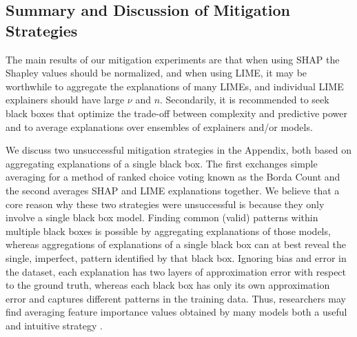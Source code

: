 \documentclass[12pt]{article}  %
\begin{document}
    \subsection{Summary and Discussion of Mitigation Strategies}
            \label{sec:summary_and_strategies}
             The main results of our mitigation experiments are that when using SHAP the Shapley values should be normalized, and when using LIME, it may be worthwhile to aggregate the explanations of many LIMEs, and individual LIME explainers should have large $\nu$ and $n$. Secondarily, it is recommended to seek black boxes that optimize the trade-off between complexity and predictive power and to average explanations over ensembles of explainers and/or models. 

            We discuss two unsuccessful mitigation strategies in the Appendix, both based on aggregating explanations of a single black box. The first exchanges simple averaging for a method of ranked choice voting known as the Borda Count and the second averages SHAP and LIME explanations together. We believe that a core reason why these two strategies were unsuccessful is because they only involve a single black box model. Finding common (valid) patterns within multiple black boxes is possible by aggregating explanations of those models, whereas aggregations of explanations of a single black box can at best reveal the single, imperfect, pattern identified by that black box. Ignoring bias and error in the dataset, each explanation has two layers of approximation error with respect to the ground truth, whereas each black box has only its own approximation error and captures different patterns in the training data. Thus, researchers may find averaging feature importance values obtained by many models both a useful and intuitive strategy \citep{dong2020variable,donnelly2023rashomon}.  %
            
\end{document}
